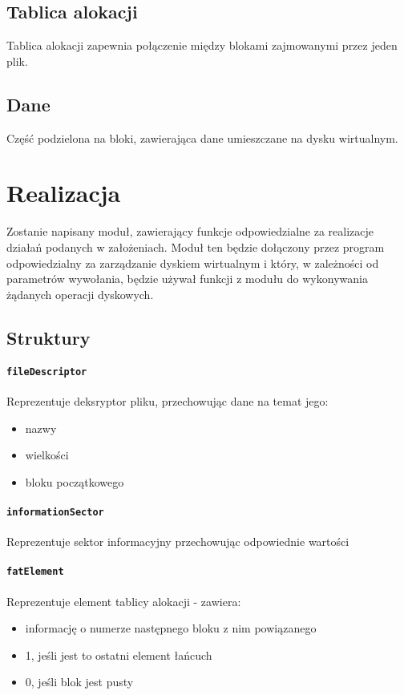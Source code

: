 \documentclass[12pt,a4paper]{article}
\begin{document}
\subsection{Tablica alokacji}
Tablica alokacji zapewnia połączenie między blokami zajmowanymi przez jeden plik.
\subsection{Dane}
Część podzielona na bloki, zawierająca dane umieszczane na dysku wirtualnym.

\section{Realizacja}
Zostanie napisany moduł, zawierający funkcje odpowiedzialne za realizacje działań podanych w założeniach. Moduł ten będzie dołączony przez program odpowiedzialny za zarządzanie dyskiem wirtualnym i który, w zależności od parametrów wywołania, będzie używał funkcji z modułu do wykonywania żądanych operacji dyskowych.

\subsection{Struktury}
\paragraph{\texttt{fileDescriptor}}
Reprezentuje deksryptor pliku, przechowując dane na temat jego:
\begin{itemize}
\item nazwy
\item wielkości
\item bloku początkowego
\end{itemize}
\paragraph{\texttt{informationSector}}
Reprezentuje sektor informacyjny przechowując odpowiednie wartości
\paragraph{\texttt{fatElement}}
Reprezentuje element tablicy alokacji - zawiera:
\begin{itemize}
\item informację o numerze następnego bloku z nim powiązanego
\item 1, jeśli jest to ostatni element łańcuch
\item 0, jeśli blok jest pusty
\end{itemize}
\end{document}
